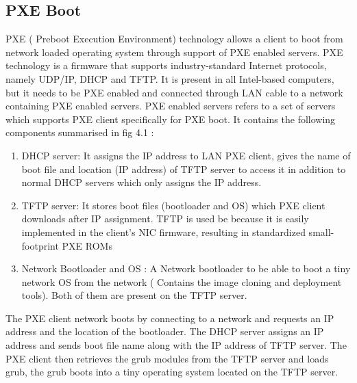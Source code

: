 \documentclass[a4paper,12pt]{article}
\begin{document}
\subsection{ PXE Boot}
PXE ( Preboot Execution Environment) technology allows a client to boot from network loaded operating system through support of PXE enabled servers. PXE technology is a firmware that supports industry-standard Internet protocols, namely UDP/IP, DHCP and TFTP. It is present in all Intel-based computers, but it needs to be PXE enabled and connected through LAN cable to a network containing PXE enabled servers. 
PXE enabled servers refers to a set of servers which supports PXE client specifically for PXE boot. It contains the following components summarised in fig 4.1 : 
\begin{enumerate}
 \item DHCP server: It assigns the IP address to LAN PXE client, gives the name of boot file and location (IP address) of TFTP server to access it in addition to normal DHCP servers which only assigns the IP address.
 \item  TFTP server: It stores boot files (bootloader and OS)  which  PXE client downloads after IP assignment. TFTP is used be because it is easily implemented in the client's NIC firmware, resulting in standardized small-footprint PXE ROMs
 \item  Network Bootloader and OS : A Network bootloader to be able to boot a tiny network OS from the network ( Contains the image cloning and deployment tools). Both of them are present on the TFTP server.
 \end{enumerate}
 The PXE client network boots by connecting to a network and requests an IP address and the location of the bootloader. The DHCP server assigns an IP address and sends boot file name along with the IP address of TFTP server. The PXE client then retrieves the grub modules from the TFTP server and loads grub, the grub boots into a tiny operating system located on the TFTP server.
\end{document}
